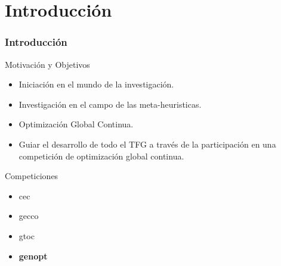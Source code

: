 
\section{Introducción}
\begin{frame}
\frametitle{Introducción}
\begin{block}{Motivación y Objetivos}
\begin{itemize}
	\item Iniciación en el mundo de la investigación.
	\item Investigación en el campo de las meta-heuristicas.
	\item Optimización Global Continua.
  \item Guiar el desarrollo de todo el TFG a través de la participación en una competición de optimización global continua.
\end{itemize}
\end{block}
\begin{block}{Competiciones}
  \begin{itemize}
  \Fontvi
  \item\gls{cec}
  \item\gls{gecco}
  \item\gls{gtoc} 
  \item\textbf{\gls{genopt}}
  \end{itemize}
\end{block}
\end{frame}
